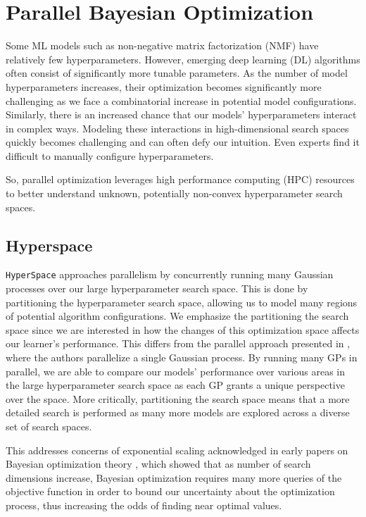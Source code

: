 \section{Parallel Bayesian Optimization}
Some ML models such as non-negative matrix factorization (NMF) have relatively few hyperparameters. 
However, emerging deep learning (DL) algorithms often consist of significantly more tunable parameters. 
As the number of model hyperparameters increases, their optimization becomes significantly more challenging as we face a combinatorial increase in potential model configurations. 
Similarly, there is an increased chance that our models' hyperparameters interact in complex ways. 
Modeling these interactions in high-dimensional search spaces quickly becomes challenging and can often defy our intuition. 
Even experts find it difficult to manually configure hyperparameters.

So, parallel optimization leverages high performance computing (HPC) resources to better understand unknown, potentially non-convex hyperparameter search spaces.

\subsection{Hyperspace}
\texttt{HyperSpace}\cite{YoungHRK18} approaches parallelism by concurrently running many Gaussian processes over our large hyperparameter search space. 
This is done by partitioning the hyperparameter search space, allowing us to model many regions of potential algorithm configurations. 
We emphasize the partitioning the search space since we are interested in how the changes of this optimization space affects our learner’s performance. 
This differs from the parallel approach presented in \cite{SnoekLA12}, where the authors parallelize a single Gaussian process. 
By running many GPs in parallel, we are able to compare our models' performance over various areas in the large hyperparameter search space as each GP grants a unique perspective over the
space. 
More critically, partitioning the search space means that a more detailed search is performed as many more models are explored across a diverse set of search spaces.

This addresses concerns of exponential scaling acknowledged in early papers on Bayesian optimization theory \cite{pmlr-v9-grunewalder10a} \cite{Srinivas.2012}, which showed that as number of search dimensions increase, Bayesian optimization requires many more queries of the objective function in order to bound our uncertainty about the optimization process, thus increasing the odds of finding near optimal values.


